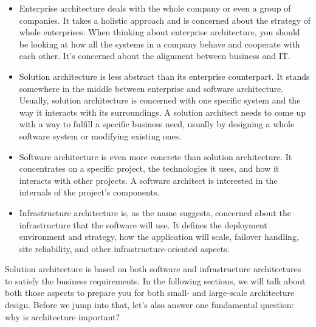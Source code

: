 \begin{itemize}
\item 
Enterprise architecture deals with the whole company or even a group of companies. It takes a holistic approach and is concerned about the strategy of whole enterprises. When thinking about enterprise architecture, you should be looking at how all the systems in a company behave and cooperate with each other. It's concerned about the alignment between business and IT.

\item 
Solution architecture is less abstract than its enterprise counterpart. It stands somewhere in the middle between enterprise and software architecture. Usually, solution architecture is concerned with one specific system and the way it interacts with its surroundings. A solution architect needs to come up with a way to fulfill a specific business need, usually by designing a whole software system or modifying existing ones.

\item
Software architecture is even more concrete than solution architecture. It concentrates on a specific project, the technologies it uses, and how it interacts with other projects. A software architect is interested in the internals of the project's components.

\item
Infrastructure architecture is, as the name suggests, concerned about the infrastructure that the software will use. It defines the deployment environment and strategy, how the application will scale, failover handling, site reliability, and other infrastructure-oriented aspects.

\end{itemize}

Solution architecture is based on both software and infrastructure architectures to satisfy the business requirements. In the following sections, we will talk about both those aspects to prepare you for both small- and large-scale architecture design. Before we jump into that, let's also answer one fundamental question: why is architecture important?













